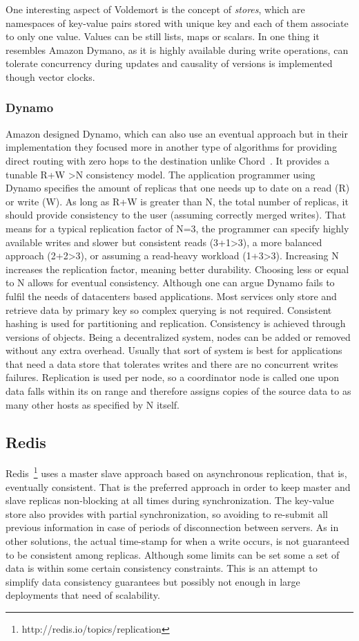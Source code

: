 	One interesting aspect of Voldemort is the concept of \emph{stores}, which are namespaces of key-value pairs stored with unique key and each of them associate to only one value. Values can be still lists, maps or scalars. In one thing it resembles Amazon Dymano, as it is highly available during write operations, can tolerate concurrency during updates and causality of versions is implemented though vector clocks.

	\subsubsection{Dynamo}
	Amazon designed Dynamo, which can also use an eventual approach but in their implementation they focused more in another type of algorithms for providing direct routing with zero hops to the destination unlike Chord~\cite{Stoica:2001}. It provides a tunable R+W \textgreater N consistency model. The application programmer using Dynamo specifies the amount of replicas that one needs up to date on a read (R) or write (W). As long as R+W is greater than N, the total number of replicas, it should provide consistency to the user (assuming correctly merged writes). That means for a typical replication factor of N=3, the programmer can specify highly available writes and slower but consistent reads (3+1\textgreater3), a more balanced approach (2+2>3), or assuming a read-heavy workload (1+3\textgreater3). Increasing N increases the replication factor, meaning better durability. Choosing  less or equal to N allows for eventual consistency. Although one can argue Dynamo fails to fulfil the needs of datacenters based applications.
	Most services only store and retrieve data by primary key so complex querying is not required. Consistent hashing is used for partitioning and replication. Consistency is achieved through versions of objects. Being a decentralized system, nodes can be added or removed without any extra overhead. Usually that sort of system is best for applications that need a data store that tolerates writes and there are no concurrent writes failures.
	Replication is used per node, so a coordinator node is called one upon data falls within its on range and therefore assigns copies of the source data to as many other hosts as specified by N itself.

	\subsection{Redis}
	Redis~\footnote{http://redis.io/topics/replication} uses a master slave approach based on asynchronous replication, that is, eventually consistent. That is the preferred approach in order to keep master and slave replicas non-blocking at all times during synchronization. The key-value store also provides with partial synchronization, so avoiding to re-submit all previous information in case of periods of disconnection between servers. As in other solutions, the actual time-stamp for when a write occurs, is not guaranteed to be consistent among replicas. Although some limits can be set some a set of data is within some certain consistency constraints. This is an attempt to simplify data consistency guarantees but possibly not enough in large deployments that need of scalability.
	
